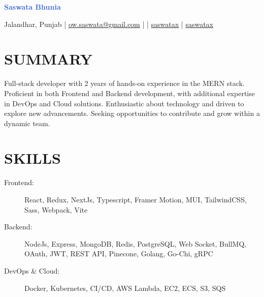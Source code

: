 \documentclass[]{resume}
\begin{document}
\textrm{\Huge\textcolor{highlight}{\textbf{Saswata Bhunia}}}
\vspace{.4em}

Jalandhar, Punjab | \href{mailto:ow.saswata@gmail.com}{\faEnvelope \space ow.saswata@gmail.com} | \faPhone {} | \href{https://www.linkedin.com/in/saswatax}{\faLinkedin \space saswatax} | \href{https://github.com/saswatax}{\faGithub \space saswatax}
\vspace{.4em}

\section{SUMMARY}
Full-stack developer with 2 years of hands-on experience in the MERN stack. Proficient in both Frontend and Backend development, with additional expertise in DevOps and Cloud solutions. Enthusiastic about technology and driven to explore new advancements. Seeking opportunities to contribute and grow within a dynamic team.

\section{SKILLS}
\begin{description}
  \item[Frontend:] React, Redux, NextJs, Typescript, Framer Motion, MUI, TailwindCSS, Sass, Webpack, Vite
  \item[Backend:] NodeJs, Express, MongoDB, Redis, PostgreSQL, Web Socket, BullMQ, OAuth, JWT, REST API, Pinecone, Golang, Go-Chi, gRPC
  \item[DevOps \& Cloud:] Docker, Kubernetes, CI/CD, AWS Lambda, EC2, ECS, S3, SQS
\end{description}
\end{document}
